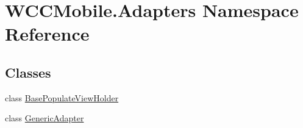 \hypertarget{namespace_w_c_c_mobile_1_1_adapters}{}\section{W\+C\+C\+Mobile.\+Adapters Namespace Reference}
\label{namespace_w_c_c_mobile_1_1_adapters}
\subsection*{Classes}
\begin{DoxyCompactItemize}
\item 
class \hyperlink{class_w_c_c_mobile_1_1_adapters_1_1_base_populate_view_holder}{Base\+Populate\+View\+Holder}
\item 
class \hyperlink{class_w_c_c_mobile_1_1_adapters_1_1_generic_adapter}{Generic\+Adapter}
\end{DoxyCompactItemize}
